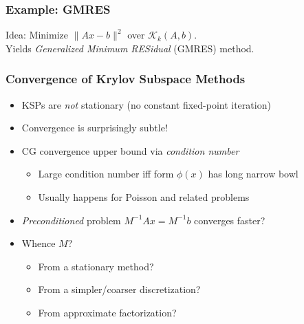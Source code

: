 \documentclass{beamer}
\begin{document}
\begin{frame}
  \frametitle{Example: GMRES}

  Idea: Minimize $\|Ax-b\|^2$ over $\mathcal{K}_k(A,b)$. \\
  Yields {\em Generalized Minimum RESidual} (GMRES) method.
\end{frame}


\begin{frame}
  \frametitle{Convergence of Krylov Subspace Methods}

  \begin{itemize}
  \item KSPs are {\em not} stationary (no constant fixed-point iteration)
  \item Convergence is surprisingly subtle!
  \item CG convergence upper bound via {\em condition number}
    \begin{itemize}
    \item Large condition number iff form $\phi(x)$ has long narrow bowl
    \item Usually happens for Poisson and related problems
    \end{itemize}
  \item {\em Preconditioned} problem
    $M^{-1} A x = M^{-1} b$ converges faster?
  \item Whence $M$?  
    \begin{itemize}
    \item From a stationary method?
    \item From a simpler/coarser discretization?
    \item From approximate factorization?
    \end{itemize}
  \end{itemize}
\end{frame}
\end{document}
